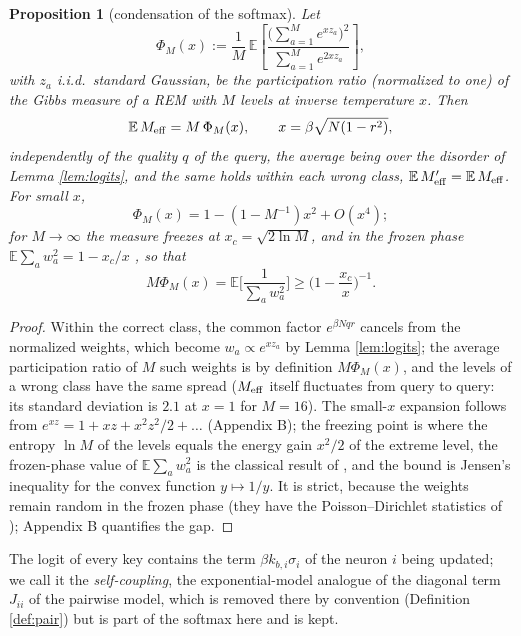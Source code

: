 \documentclass[11pt,a4paper]{article}
\newtheorem{proposition}{Proposition}
\newcommand{\E}{\mathbb{E}}
\newcommand{\Meff}{M_{\rm eff}}
\begin{document}
\begin{proposition}[condensation of the softmax]\label{prop:rem}
Let
\begin{equation*}
\Phi_M(x):=\frac1M\,\E\!\left[\frac{\big(\sum_{a=1}^Me^{xz_a}\big)^2}{\sum_{a=1}^Me^{2xz_a}}\right],
\end{equation*}
with $z_a$ i.i.d.\ standard Gaussian, be the participation ratio (normalized to one) of the Gibbs measure of a REM with $M$ levels at inverse temperature $x$. Then
\begin{equation}
\E\,\Meff=M\,\Phi_M(x),\qquad x=\beta\sqrt{N(1-r^2)},
\label{eq:Meff}
\end{equation}
independently of the quality $q$ of the query, the average being over the disorder of Lemma \ref{lem:logits}, and the same holds within each wrong class, $\E\,\Meff'=\E\,\Meff$. For small $x$,
\begin{equation*}
\Phi_M(x)=1-(1-M^{-1})x^2+O(x^4);
\end{equation*}
for $M\to\infty$ the measure freezes at $x_c=\sqrt{2\ln M}$, and in the frozen phase $\E\sum_aw_a^2=1-x_c/x$ \cite{Derrida1980,Derrida1981,Derrida1985b,MPV1985}, so that
\begin{equation*}
M\Phi_M(x)=\E\Big[\frac{1}{\sum_aw_a^2}\Big]\ge\Big(1-\frac{x_c}{x}\Big)^{-1}.
\end{equation*}
\end{proposition}
\begin{proof}
Within the correct class, the common factor $e^{\beta Nqr}$ cancels from the normalized weights, which become $w_a\propto e^{xz_a}$ by Lemma \ref{lem:logits}; the average participation ratio of $M$ such weights is by definition $M\Phi_M(x)$, and the levels of a wrong class have the same spread ($\Meff$ itself fluctuates from query to query: its standard deviation is $2.1$ at $x=1$ for $M=16$). The small-$x$ expansion follows from $e^{xz}=1+xz+x^2z^2/2+\dots$ (Appendix B); the freezing point is where the entropy $\ln M$ of the levels equals the energy gain $x^2/2$ of the extreme level, the frozen-phase value of $\E\sum_aw_a^2$ is the classical result of \cite{Derrida1985b,MPV1985}, and the bound is Jensen's inequality for the convex function $y\mapsto1/y$. It is strict, because the weights remain random in the frozen phase (they have the Poisson--Dirichlet statistics of \cite{MPV1985}); Appendix B quantifies the gap.
\end{proof}

The logit of every key contains the term $\beta k_{b,i}\sigma_i$ of the neuron $i$ being updated; we call it the \emph{self-coupling}, the exponential-model analogue of the diagonal term $J_{ii}$ of the pairwise model, which is removed there by convention (Definition \ref{def:pair}) but is part of the softmax here and is kept.
\end{document}

